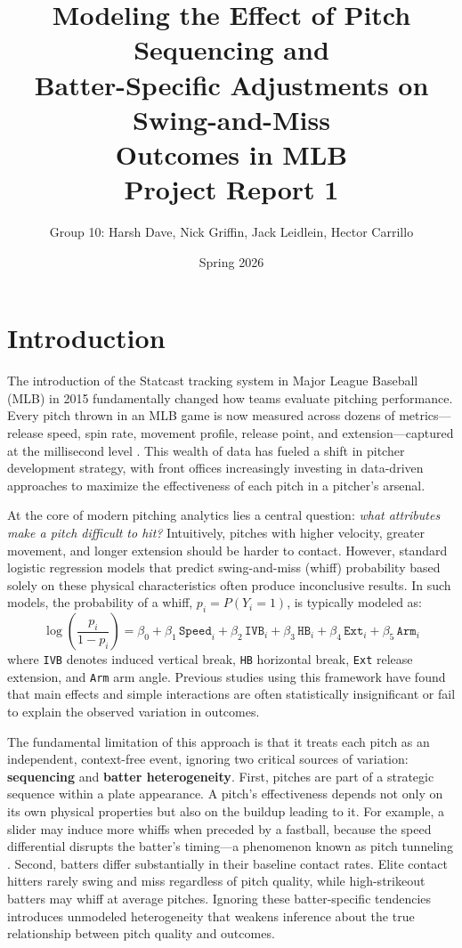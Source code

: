 \documentclass[11pt]{article}
\title{\textbf{Modeling the Effect of Pitch Sequencing and\\
Batter-Specific Adjustments on Swing-and-Miss\\
Outcomes in MLB} \\[6pt]
\large Project Report 1}
\author{Group 10: Harsh Dave, Nick Griffin, Jack Leidlein, Hector Carrillo}
\date{Spring 2026}
\begin{document}
\maketitle

\section{Introduction}

The introduction of the Statcast tracking system in Major League Baseball (MLB) in 2015 fundamentally changed how teams evaluate pitching performance.
Every pitch thrown in an MLB game is now measured across dozens of metrics---release speed, spin rate, movement profile, release point, and extension---captured at the millisecond level \citep{statcast2024}.
This wealth of data has fueled a shift in pitcher development strategy, with front offices increasingly investing in data-driven approaches to maximize the effectiveness of each pitch in a pitcher's arsenal.

At the core of modern pitching analytics lies a central question: \textit{what attributes make a pitch difficult to hit?}
Intuitively, pitches with higher velocity, greater movement, and longer extension should be harder to contact.
However, standard logistic regression models that predict swing-and-miss (whiff) probability based solely on these physical characteristics often produce inconclusive results.
In such models, the probability of a whiff, $p_i = P(Y_i = 1)$, is typically modeled as:
%
\begin{equation}\label{eq:baseline}
    \log\!\left(\frac{p_i}{1 - p_i}\right)
    = \beta_0
    + \beta_1 \,\texttt{Speed}_i
    + \beta_2 \,\texttt{IVB}_i
    + \beta_3 \,\texttt{HB}_i
    + \beta_4 \,\texttt{Ext}_i
    + \beta_5 \,\texttt{Arm}_i
\end{equation}
%
where \texttt{IVB} denotes induced vertical break, \texttt{HB} horizontal break, \texttt{Ext} release extension, and \texttt{Arm} arm angle.
Previous studies using this framework have found that main effects and simple interactions are often statistically insignificant or fail to explain the observed variation in outcomes.

The fundamental limitation of this approach is that it treats each pitch as an independent, context-free event, ignoring two critical sources of variation: \textbf{sequencing} and \textbf{batter heterogeneity}.
First, pitches are part of a strategic sequence within a plate appearance.
A pitch's effectiveness depends not only on its own physical properties but also on the buildup leading to it.
For example, a slider may induce more whiffs when preceded by a fastball, because the speed differential disrupts the batter's timing---a phenomenon known as pitch tunneling \citep{toporek2017tunneling}.
Second, batters differ substantially in their baseline contact rates.
Elite contact hitters rarely swing and miss regardless of pitch quality, while high-strikeout batters may whiff at average pitches.
Ignoring these batter-specific tendencies introduces unmodeled heterogeneity that weakens inference about the true relationship between pitch quality and outcomes.
\end{document}
